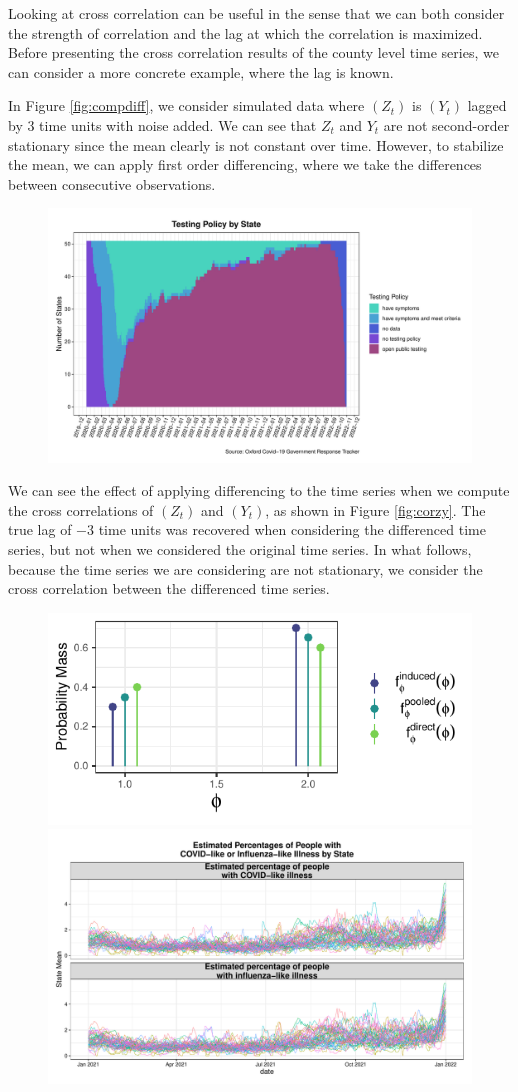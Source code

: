 \documentclass[12pt,twoside]{smiththesis}
\begin{document}
Looking at cross correlation can be useful in the sense that we can both consider the strength of correlation and the lag at which the correlation is maximized. Before presenting the cross correlation results of the county level time series, we can consider a more concrete example, where the lag is known.

In Figure \ref{fig:compdiff}, we consider simulated data where \((Z_t)\) is \((Y_t)\) lagged by 3 time units with noise added. We can see that \(Z_t\) and \(Y_t\) are not second-order stationary since the mean clearly is not constant over time. However, to stabilize the mean, we can apply first order differencing, where we take the differences between consecutive observations.
\begin{figure}
\includegraphics[width=1\linewidth]{thesis_files/figure-latex/unnamed-chunk-6-1} \caption{\label{fig:compdiff}}\label{fig:unnamed-chunk-6}
\end{figure}
We can see the effect of applying differencing to the time series when we compute the cross correlations of \((Z_t)\) and \((Y_t)\), as shown in Figure \ref{fig:corzy}. The true lag of \(-3\) time units was recovered when considering the differenced time series, but not when we considered the original time series. In what follows, because the time series we are considering are not stationary, we consider the cross correlation between the differenced time series.
\vspace{5 cm}
\begin{figure}
\includegraphics[width=0.45\linewidth]{thesis_files/figure-latex/unnamed-chunk-7-1} \includegraphics[width=0.45\linewidth]{thesis_files/figure-latex/unnamed-chunk-7-2} \caption{\label{fig:corzy}}\label{fig:unnamed-chunk-7}
\end{figure}
\end{document}
